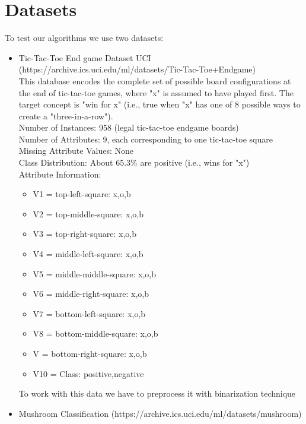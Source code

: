 \documentclass[12t]{article}
\begin{document}
\section{Datasets}
To test our algorithms we use two datasets: 
\begin{itemize}
	\item Tic-Tac-Toe End game Dataset UCI (https://archive.ics.uci.edu/ml/datasets/Tic-Tac-Toe+Endgame) \\
	
	This database encodes the complete set of possible board configurations at the end of tic-tac-toe games, where "x" is assumed to have played first. The target concept is "win for x" (i.e., true when "x" has one of 8 possible ways to create a "three-in-a-row").\\

	Number of Instances: 958 (legal tic-tac-toe endgame boards)\\
	
	Number of Attributes: 9, each corresponding to one tic-tac-toe square \\

	Missing Attribute Values: None \\
	
	Class Distribution: About 65.3\% are positive (i.e., wins for "x") \\
	
Attribute Information:
\begin{itemize}
	
\item	V1 = top-left-square: {x,o,b}
\item   V2 = top-middle-square: {x,o,b}	
\item	V3 = top-right-square: {x,o,b}
\item	V4 = middle-left-square: {x,o,b}
\item	V5 = middle-middle-square: {x,o,b}
\item	V6 = middle-right-square: {x,o,b}
\item	V7 = bottom-left-square: {x,o,b}
\item	V8 = bottom-middle-square: {x,o,b}
\item	V = bottom-right-square: {x,o,b}
\item	V10 = Class: {positive,negative}

\end{itemize}
	
	To work with this data we have to preprocess it with binarization technique
	
	\item Mushroom Classification (https://archive.ics.uci.edu/ml/datasets/mushroom)
	

\end{itemize}
\end{document}
